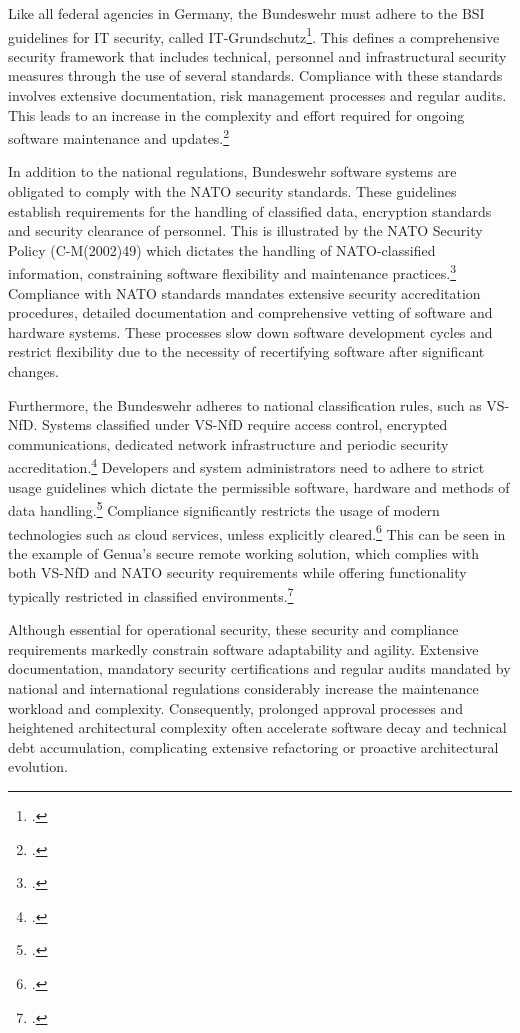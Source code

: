 Like all federal agencies in Germany, the Bundeswehr must adhere to the \ac{BSI} guidelines for IT security, called IT-Grundschutz\footcite[no page number]{BSIFAQ}. This defines a comprehensive security framework
that includes technical, personnel and infrastructural security measures through the use of several standards. Compliance with these standards involves extensive documentation, risk management processes and regular audits. 
This leads to an increase in the complexity and effort required for ongoing software maintenance and updates.\footcite[no page number]{BSIStandards}

In addition to the national regulations, Bundeswehr software systems are obligated to comply with the NATO security standards. These guidelines establish requirements for the handling of classified data, encryption standards and security clearance of personnel.
This is illustrated by the NATO Security Policy (C-M(2002)49) which dictates the handling of NATO-classified information, constraining software flexibility and maintenance practices.\footcite[Enclosure B, pp. 1–3; Enclosure F, pp. 1–2]{NATO2002SecurityPolicy} 
Compliance with NATO standards mandates extensive security accreditation procedures, detailed documentation and comprehensive vetting of software and hardware systems.
These processes slow down software development cycles and restrict flexibility due to the necessity of recertifying software after significant changes.

Furthermore, the Bundeswehr adheres to national classification rules, such as \ac{VS-NfD}. Systems classified under \ac{VS-NfD} require access control, encrypted communications, dedicated network infrastructure and periodic security accreditation.\footcite[see Part 2, pp. 1–3; Part 3, pp. 1–6]{BMI2010VSNFD}
Developers and system administrators need to adhere to strict usage guidelines which dictate the permissible software, hardware and methods of data handling.\footcite[Part 3, No. 3.1–3.7, pp. 1–5]{BMI2010VSNFD} Compliance significantly restricts the usage of modern technologies such as cloud services, unless explicitly cleared.\footcite[Part 3, No. 3.4.1–3.4.5, pp. 4–5]{BMI2010VSNFD} 
This can be seen in the example of Genua’s secure remote working solution, which complies with both VS-NfD and NATO security requirements while offering functionality typically restricted in classified environments.\footcite[no page number]{Genua2023VSNFD}

Although essential for operational security, these security and compliance requirements markedly constrain software adaptability and agility. 
Extensive documentation, mandatory security certifications and regular audits mandated by national and international regulations considerably increase the maintenance workload and complexity. 
Consequently, prolonged approval processes and heightened architectural complexity often accelerate software decay and technical debt accumulation, complicating extensive refactoring or proactive architectural evolution.

